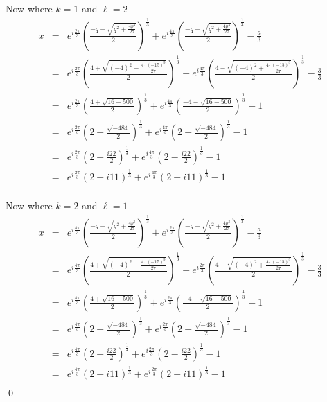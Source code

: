 \documentclass[10pt]{amsart}
\theoremstyle{nonumberplain}
\begin{document}
\begin{enumerate}[label={\bf {\arabic*}:}]
\begin{itemize}
Now where $k=1$ and $\ell=2$
\begin{eqnarray*}
x &=& e^{i\frac{2\pi}{3}} \left(\frac{-q + \sqrt{q^2 + \frac{4p^3}{27}}}{2}\right)^{\frac{1}{3}} + e^{i\frac{4\pi}{3}} \left(\frac{-q - \sqrt{q^2 + \frac{4p^3}{27}}}{2}\right)^{\frac{1}{3}} -\frac{a}{3} \\
   &=& e^{i\frac{2\pi}{3}} \left(\frac{4 + \sqrt{(-4)^2 + \frac{4 \cdot (-15)^3}{27}}}{2}\right)^{\frac{1}{3}} + e^{i\frac{4\pi}{3}} \left(\frac{4 - \sqrt{(-4)^2 + \frac{4 \cdot (-15)^3}{27}}}{2}\right)^{\frac{1}{3}} -\frac{3}{3} \\
   &=& e^{i\frac{2\pi}{3}} \left(\frac{4 + \sqrt{16 - 500}}{2}\right)^{\frac{1}{3}} + e^{i\frac{4\pi}{3}} \left(\frac{-4 - \sqrt{16 - 500}}{2}\right)^{\frac{1}{3}} -1 \\
   &=& e^{i\frac{2\pi}{3}} \left(2 + \frac{\sqrt{-484}}{2}\right)^{\frac{1}{3}} +e^{i\frac{4\pi}{3}}  \left(2 - \frac{\sqrt{-484}}{2}\right)^{\frac{1}{3}} -1 \\
   &=& e^{i\frac{2\pi}{3}} \left(2 + \frac{i22}{2}\right)^{\frac{1}{3}} + e^{i\frac{4\pi}{3}} \left(2 - \frac{i22}{2}\right)^{\frac{1}{3}} -1 \\
   &=& e^{i\frac{2\pi}{3}} \left(2 + i11\right)^{\frac{1}{3}} + e^{i\frac{4\pi}{3}} \left(2 - i11\right)^{\frac{1}{3}} -1 \\
\end{eqnarray*}

Now where $k=2$ and $\ell=1$
\begin{eqnarray*}
x &=& e^{i\frac{4\pi}{3}} \left(\frac{-q + \sqrt{q^2 + \frac{4p^3}{27}}}{2}\right)^{\frac{1}{3}} + e^{i\frac{2\pi}{3}} \left(\frac{-q - \sqrt{q^2 + \frac{4p^3}{27}}}{2}\right)^{\frac{1}{3}} -\frac{a}{3} \\
   &=& e^{i\frac{4\pi}{3}} \left(\frac{4 + \sqrt{(-4)^2 + \frac{4 \cdot (-15)^3}{27}}}{2}\right)^{\frac{1}{3}} + e^{i\frac{2\pi}{3}} \left(\frac{4 - \sqrt{(-4)^2 + \frac{4 \cdot (-15)^3}{27}}}{2}\right)^{\frac{1}{3}} -\frac{3}{3} \\
   &=& e^{i\frac{4\pi}{3}} \left(\frac{4 + \sqrt{16 - 500}}{2}\right)^{\frac{1}{3}} + e^{i\frac{2\pi}{3}} \left(\frac{-4 - \sqrt{16 - 500}}{2}\right)^{\frac{1}{3}} -1 \\
   &=& e^{i\frac{4\pi}{3}} \left(2 + \frac{\sqrt{-484}}{2}\right)^{\frac{1}{3}} + e^{i\frac{2\pi}{3}} \left(2 - \frac{\sqrt{-484}}{2}\right)^{\frac{1}{3}} -1 \\
   &=& e^{i\frac{4\pi}{3}} \left(2 + \frac{i22}{2}\right)^{\frac{1}{3}} + e^{i\frac{2\pi}{3}} \left(2 - \frac{i22}{2}\right)^{\frac{1}{3}} -1 \\
   &=& e^{i\frac{4\pi}{3}} \left(2 + i11\right)^{\frac{1}{3}} + e^{i\frac{2\pi}{3}} \left(2 - i11\right)^{\frac{1}{3}} -1 \\
\end{eqnarray*}
\qed
  \end{itemize}



\end{enumerate}
\end{document}
